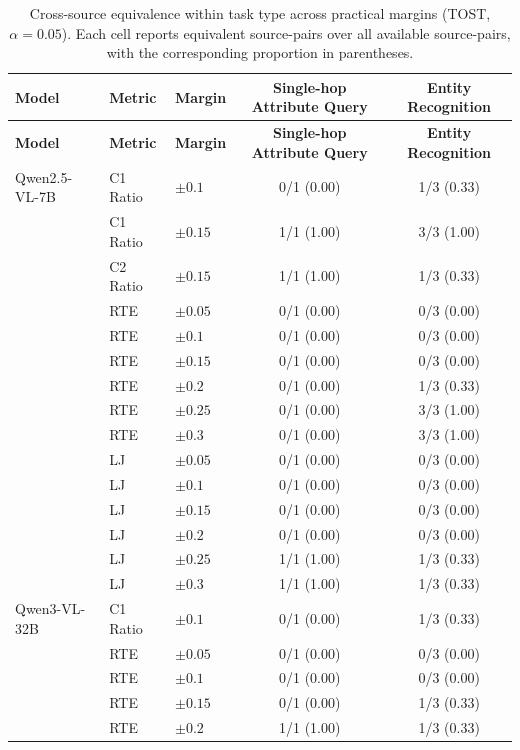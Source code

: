 \setlength{\tabcolsep}{3pt}
\small
\begin{longtable}{lllcc}
\caption{Cross-source equivalence within task type across practical margins (TOST, $\alpha=0.05$). Each cell reports equivalent source-pairs over all available source-pairs, with the corresponding proportion in parentheses.}\label{tab:cross_source_consistency_one_table}\\
\toprule
\textbf{Model} & \textbf{Metric} & \textbf{Margin} & \textbf{Single-hop Attribute Query} & \textbf{Entity Recognition} \\
\midrule
\endfirsthead
\toprule
\textbf{Model} & \textbf{Metric} & \textbf{Margin} & \textbf{Single-hop Attribute Query} & \textbf{Entity Recognition} \\
\midrule
\endhead
\bottomrule
\endfoot
Qwen2.5-VL-7B & C1 Ratio & $\pm0.1$ & 0/1 (0.00) & 1/3 (0.33) \\
 & C1 Ratio & $\pm0.15$ & 1/1 (1.00) & 3/3 (1.00) \\
\midrule
 & C2 Ratio & $\pm0.15$ & 1/1 (1.00) & 1/3 (0.33) \\
\midrule
 & RTE & $\pm0.05$ & 0/1 (0.00) & 0/3 (0.00) \\
 & RTE & $\pm0.1$ & 0/1 (0.00) & 0/3 (0.00) \\
 & RTE & $\pm0.15$ & 0/1 (0.00) & 0/3 (0.00) \\
 & RTE & $\pm0.2$ & 0/1 (0.00) & 1/3 (0.33) \\
 & RTE & $\pm0.25$ & 0/1 (0.00) & 3/3 (1.00) \\
 & RTE & $\pm0.3$ & 0/1 (0.00) & 3/3 (1.00) \\
\midrule
 & LJ & $\pm0.05$ & 0/1 (0.00) & 0/3 (0.00) \\
 & LJ & $\pm0.1$ & 0/1 (0.00) & 0/3 (0.00) \\
 & LJ & $\pm0.15$ & 0/1 (0.00) & 0/3 (0.00) \\
 & LJ & $\pm0.2$ & 0/1 (0.00) & 0/3 (0.00) \\
 & LJ & $\pm0.25$ & 1/1 (1.00) & 1/3 (0.33) \\
 & LJ & $\pm0.3$ & 1/1 (1.00) & 1/3 (0.33) \\
\midrule
Qwen3-VL-32B & C1 Ratio & $\pm0.1$ & 0/1 (0.00) & 1/3 (0.33) \\
 & RTE & $\pm0.05$ & 0/1 (0.00) & 0/3 (0.00) \\
 & RTE & $\pm0.1$ & 0/1 (0.00) & 0/3 (0.00) \\
 & RTE & $\pm0.15$ & 0/1 (0.00) & 1/3 (0.33) \\
 & RTE & $\pm0.2$ & 1/1 (1.00) & 1/3 (0.33) \\

\end{longtable}
